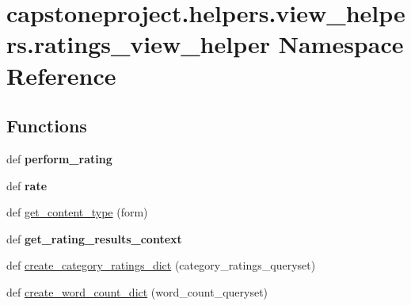\hypertarget{namespacecapstoneproject_1_1helpers_1_1view__helpers_1_1ratings__view__helper}{}\section{capstoneproject.\+helpers.\+view\+\_\+helpers.\+ratings\+\_\+view\+\_\+helper Namespace Reference}
\label{namespacecapstoneproject_1_1helpers_1_1view__helpers_1_1ratings__view__helper}
\subsection*{Functions}
\begin{DoxyCompactItemize}
\item 
\mbox{\label{namespacecapstoneproject_1_1helpers_1_1view__helpers_1_1ratings__view__helper_a2317488b1399b804dd43cbbdcf0e6105}} 
def {\bfseries perform\+\_\+rating}
\item 
\mbox{\label{namespacecapstoneproject_1_1helpers_1_1view__helpers_1_1ratings__view__helper_a60b84f9c58baa142d07a9de0d0fee787}} 
def {\bfseries rate}
\item 
def \mbox{\hyperlink{namespacecapstoneproject_1_1helpers_1_1view__helpers_1_1ratings__view__helper_adc84fcd81842d2ed6863e4b53e003917}{get\+\_\+content\+\_\+type}} (form)
\item 
\mbox{\label{namespacecapstoneproject_1_1helpers_1_1view__helpers_1_1ratings__view__helper_a23e8428fb8e7859b05f620440c152071}} 
def {\bfseries get\+\_\+rating\+\_\+results\+\_\+context}
\item 
def \mbox{\hyperlink{namespacecapstoneproject_1_1helpers_1_1view__helpers_1_1ratings__view__helper_acb139c5d06d2ee9d1df2479641e6ca31}{create\+\_\+category\+\_\+ratings\+\_\+dict}} (category\+\_\+ratings\+\_\+queryset)
\item 
def \mbox{\hyperlink{namespacecapstoneproject_1_1helpers_1_1view__helpers_1_1ratings__view__helper_a89961e5544cbcf87fb0f66b15e980169}{create\+\_\+word\+\_\+count\+\_\+dict}} (word\+\_\+count\+\_\+queryset)

\end{DoxyCompactItemize}
